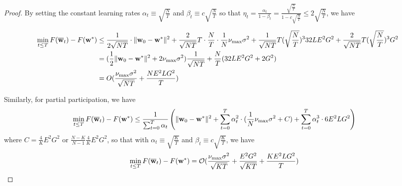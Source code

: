 \begin{proof}
	By setting the constant learning rates $\alpha_{t}\equiv\sqrt{\frac{N}{T}}$
	and $\beta_{t}\equiv c\sqrt{\frac{N}{T}}$ so that $\eta_{t}=\frac{\alpha_{t}}{1-\beta_{t}}=\frac{\sqrt{\frac{N}{T}}}{1-c\sqrt{\frac{N}{T}}}\leq2\sqrt{\frac{N}{T}}$,
	we have 
	
	\begin{align*}
	\min_{t\leq T}F({\overline{\mathbf{w}}}_{t})-F({\mathbf{w}}^{\ast}) & \leq\frac{1}{2\sqrt{NT}}\cdot\|{\mathbf{w}}_{0}-{\mathbf{w}}^{\ast}\|^{2}+\frac{2}{\sqrt{NT}}T\cdot\frac{N}{T}\cdot\frac{1}{N}\nu_{\max}\sigma^{2}+\frac{1}{\sqrt{NT}}T(\sqrt{\frac{N}{T}})^{3}32LE^{2}G^{2}+\frac{2}{\sqrt{NT}}T(\sqrt{\frac{N}{T}})^{3}G^{2}\\
	& =(\frac{1}{2}\|{\mathbf{w}}_{0}-{\mathbf{w}}^{\ast}\|^{2}+2\nu_{\max}\sigma^{2})\frac{1}{\sqrt{NT}}+\frac{N}{T}(32LE^{2}G^{2}+2G^{2})\\
	& =O(\frac{\nu_{\max}\sigma^{2}}{\sqrt{NT}}+\frac{NE^{2}LG^{2}}{T})
	\end{align*}
	
	Similarly, for partial participation, we have 
	\begin{align*}
	\min_{t\leq T}F({\overline{\mathbf{w}}}_{t})-F({\mathbf{w}}^{\ast}) & \leq\frac{1}{\sum_{t=0}^{T}\alpha_{t}}\left(\|{\mathbf{w}}_{0}-{\mathbf{w}}^{\ast}\|^{2}+\sum_{t=0}^{T}\alpha_{t}^{2}\cdot(\frac{1}{N}\nu_{\max}\sigma^{2}+C)+\sum_{t=0}^{T}\alpha_{t}^{3}\cdot6E^{2}LG^{2}\right)
	\end{align*}
	where $C=\frac{4}{K}E^{2}G^{2}$ or $\frac{N-K}{N-1}\frac{4}{K}E^{2}G^{2}$,
	so that with $\alpha_{t}\equiv\sqrt{\frac{K}{T}}$ and $\beta_{t}\equiv c\sqrt{\frac{K}{T}}$,
	we have 
	\begin{align*}
	\min_{t\leq T}F({\overline{\mathbf{w}}}_{t})-F({\mathbf{w}}^{\ast}) & =\mathcal{O}(\frac{\nu_{\max}\sigma^{2}}{\sqrt{KT}}+\frac{E^{2}G^{2}}{\sqrt{KT}}+\frac{KE^{2}LG^{2}}{T})
	\end{align*}
\end{proof}